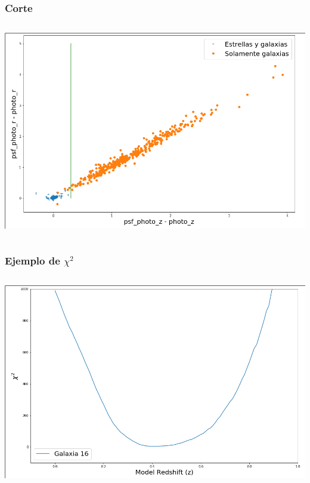 \documentclass{beamer}
\begin{document}
\begin{frame}
\frametitle{Corte}
\begin{columns}
	\begin{column}{10cm}
		\includegraphics[width=\columnwidth]{corte.png} 
	\end{column}
\end{columns}
\end{frame}

\begin{frame}
\frametitle{Ejemplo de $\chi^2$}
\begin{columns}
	\begin{column}{10cm}
		\includegraphics[width=\columnwidth]{chi2.png} 
	\end{column}
\end{columns}
\end{frame}
\end{document}
